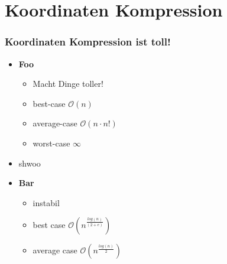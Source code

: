 \section{Koordinaten Kompression}

\begin{frame}
	\frametitle{{Koordinaten Kompression ist toll!}}
	\begin{itemize}
		\pause
		\item \textbf{Foo}
		\begin{itemize}
			\pause
			\item Macht Dinge toller! 
			\item best-case $\mathcal O(n)$
			\item average-case $\mathcal O(n\cdot n!)$
			\item worst-case $\infty$
		\end{itemize}
		\pause
		\item shwoo
		\pause
		\item \textbf{Bar}
			\begin{itemize}
				\pause
				\item instabil
				\item best case $\mathcal O(n^ \frac{log(n)}{(2+e)})$
				\item average case $\mathcal O(n^ \frac{log(n)}{2})$
			\end{itemize}	
	\end{itemize}
\end{frame}